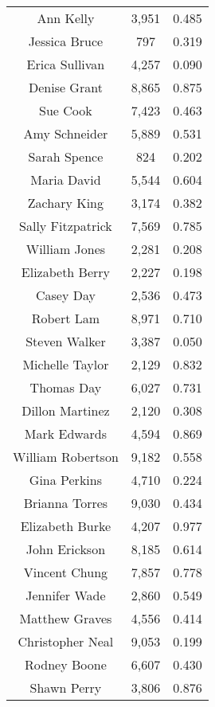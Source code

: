 \begin{longtable}{ccc}
  Ann Kelly & 3,951 & 0.485 \\
  Jessica Bruce & 797 & 0.319 \\
  Erica Sullivan & 4,257 & 0.090 \\
  Denise Grant & 8,865 & 0.875 \\
  Sue Cook & 7,423 & 0.463 \\
  Amy Schneider & 5,889 & 0.531 \\
  Sarah Spence & 824 & 0.202 \\
  Maria David & 5,544 & 0.604 \\
  Zachary King & 3,174 & 0.382 \\
  Sally Fitzpatrick & 7,569 & 0.785 \\
  William Jones & 2,281 & 0.208 \\
  Elizabeth Berry & 2,227 & 0.198 \\
  Casey Day & 2,536 & 0.473 \\
  Robert Lam & 8,971 & 0.710 \\
  Steven Walker & 3,387 & 0.050 \\
  Michelle Taylor & 2,129 & 0.832 \\
  Thomas Day & 6,027 & 0.731 \\
  Dillon Martinez & 2,120 & 0.308 \\
  Mark Edwards & 4,594 & 0.869 \\
  William Robertson & 9,182 & 0.558 \\
  Gina Perkins & 4,710 & 0.224 \\
  Brianna Torres & 9,030 & 0.434 \\
  Elizabeth Burke & 4,207 & 0.977 \\
  John Erickson & 8,185 & 0.614 \\
  Vincent Chung & 7,857 & 0.778 \\
  Jennifer Wade & 2,860 & 0.549 \\
  Matthew Graves & 4,556 & 0.414 \\
  Christopher Neal & 9,053 & 0.199 \\
  Rodney Boone & 6,607 & 0.430 \\
  Shawn Perry & 3,806 & 0.876 \\
  \bottomrule
\end{longtable}
